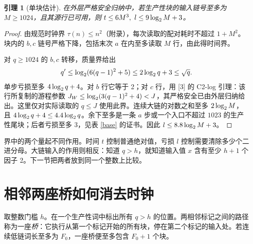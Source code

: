 \documentclass[UTF8,12pt,a4paper,fontset=fandol,scheme=plain]{ctexart}
\theoremstyle{cn}\newtheorem{thm}{定理}\newtheorem{lem}[thm]{引理}
\begin{document}
\begin{lem}[单块估计]\label{cost}在外层严格安全归纳中，若生产性块的输入链号至多为 \(M\ge1024\)，且其源行已可用，则 \(t\le6M^3,\ l\le9\log_2 M+3\)。\end{lem}
\begin{proof}
由规范时钟界 \(\tau(n)\le n^2\)（附录），每次读取的配对耗时不超过 \(1+M^2\)。块内的 \(b,c\) 链号严格下降，包括末次 \(a\) 在内至多读取 \(M\) 行，由此得时间界。

对 \(q\ge1024\) 的 \(b,c\) 转移，质量界给出
\[
 q'\le\log_2(6(q-1)^2+5)\le2\log_2 q+3\le\sqrt q .
\]
单步亏损至多 \(4\log_2 q+4\)。对 \(b\) 行它等于 2；对 \(c\) 行，用 [3] 的 C2-log 引理：该行所复制的游程参数 \(J_W\le\log_2(3(q-1)^2+4)<J\)，其严格安全已由外层归纳给出。这里仅对实际读取的 \(q\le J\) 使用此界。连续大链的对数之和至多 \(2\log_2 M\)，且 \(4\log_2 q+4\le4.4\log_2 q\)。余下至多是一条 \(a\) 步或一个入口不超过 \(1023\) 的生产性尾块；后者亏损至多 3，见表 \ref{base} 的证书。因此 \(l\le8.8\log_2 M+3\)。
\end{proof}

界中的两个量起不同作用。时间 \(t\) 控制普通绝对值，亏损 \(l\) 控制需要清除多少个二进分母。大链输入的作用则相反：知道 \(q>h\)，就知道输入值 \(x\) 含有至少 \(h+1\) 个因子 2。下一节把两者放到同一个整数上比较。

\newpage
\section{相邻两座桥如何消去时钟}
取整数门槛 \(h\)。在一个生产性词中标出所有 \(q>h\) 的位置。两相邻标记之间的路径称为一座\emph{桥}：它执行从第一个标记开始的所有块，停在第二个标记的输入处。若连续低链词长至多为 \(F_0\)，一座桥便至多包含 \(F_0+1\) 个块。
\end{document}
